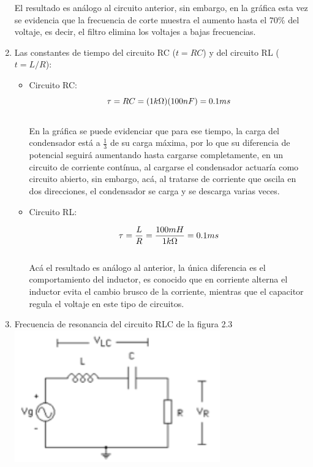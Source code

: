\documentclass[12pt]{article}
\begin{document}
\begin{enumerate}
		\noindent El resultado es análogo al circuito anterior, sin embargo, en la gráfica esta vez se evidencia que la frecuencia de corte muestra el aumento hasta el $70\%$ del voltaje, es decir, el filtro elimina los voltajes a bajas frecuencias.\\
		
		\item Las constantes de tiempo del circuito RC ($t = RC$) y del circuito RL ($t = L/R$):\\
		
		\begin{itemize}
			\item Circuito RC:\\
			
			\begin{equation}
				\notag \tau = RC = (1k\Omega)(100nF) = 0.1ms
			\end{equation}\\
		
			\noindent En la gráfica se puede evidenciar que para ese tiempo, la carga del condensador está a $\frac{1}{3}$ de su carga máxima, por lo que su diferencia de potencial seguirá aumentando hasta cargarse completamente, en un circuito de corriente contínua, al cargarse el condensador actuaría como circuito abierto, sin embargo, acá, al tratarse de corriente que oscila en dos direcciones, el condensador se carga y se descarga varias veces.\\
			
			\item Circuito RL:
			
			\begin{equation}
				\notag \tau = \frac{L}{R} = \frac{100mH}{1k\Omega} = 0.1ms
			\end{equation}\\
			
			\noindent Acá el resultado es análogo al anterior, la única diferencia es el comportamiento del inductor, es conocido que en corriente alterna el inductor evita el cambio brusco de la corriente, mientras que el capacitor regula el voltaje en este tipo de circuitos.\\
			
		\end{itemize}
		
		\item Frecuencia de resonancia del circuito RLC de la figura 2.3\\
		
		\includegraphics{Img/2_3}\\
		

\end{enumerate}
\end{document}
